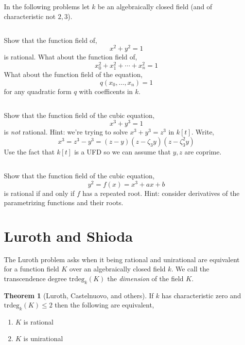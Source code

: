 \documentclass[12pt]{article}
\theoremstyle{remark}
\theoremstyle{definition}
\newtheorem{theorem}{Theorem}[subsection]
\newcommand{\trdeg}[2]{\mathrm{trdeg}_{#1}\left(#2\right)}
\begin{document}
In the following problems let $k$ be an algebraically closed field (and of characteristic not $2,3$).

\subsection{}

Show that the function field of,
\[ x^2 + y^2 = 1 \]
is rational. What about the function field of,
\[ x^2_0 + x_1^2 + \cdots + x_n^2 = 1 \]
What about the function field of the equation,
\[ q(x_0, \dots, x_n) = 1 \]
for any quadratic form $q$ with coefficents in $k$.

\subsection{}

Show that the function field of the cubic equation,
\[ x^3 + y^3 = 1  \]
is \textit{not} rational. Hint: we're trying to solve $x^3 + y^3 = z^3$ in $k[t]$. Write,
\[ x^3 = z^3 - y^3 = (z - y)(z - \zeta_3 y)(z - \zeta_3^2 y) \]
Use the fact that $k[t]$ is a UFD so we can assume that $y,z$ are coprime.  

\subsection{}

Show that the function field of the cubic equation,
\[ y^2 = f(x) = x^3 + a x + b  \]
is rational if and only if $f$ has a repeated root. Hint: consider derivatives of the parametrizing functions and their roots.


\section{Luroth and Shioda}

The Luroth problem asks when it being rational and unirational are equivalent for a function field $K$ over an algebraically closed field $k$. We call the transcendence degree $\trdeg{k}{K}$ the \textit{dimension} of the field $K$.

\begin{theorem}[Luroth, Castelnuovo, and others]
If $k$ has characteristic zero and $\trdeg{k}{K} \le 2$ then the following are equivalent,
\begin{enumerate}
\item $K$ is rational
\item $K$ is unirational
\end{enumerate} 
\end{theorem}
\end{document}
